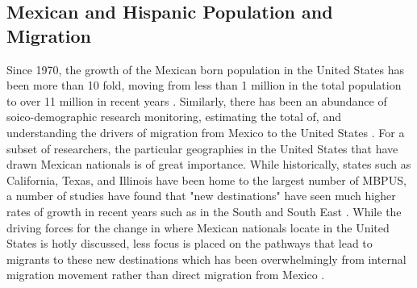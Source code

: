 \documentclass[fleqn,12pt]{olplainarticle}
\begin{document}
\subsection*{Mexican and Hispanic Population and Migration}

Since 1970, the growth of the Mexican born population in the United States has been more than 10 fold, moving from less than 1 million in the total population to over 11 million in recent years \citep{ Gonzalez-Barrera2013, Noe-Bustamante2019a}.
Similarly, there has been an abundance of soico-demographic research monitoring, estimating the total of, and understanding the drivers of migration from Mexico to the United States \citep{Massey1986}.
For a subset of researchers, the particular geographies in the United States that have drawn Mexican nationals is of great importance.
While historically, states such as California, Texas, and Illinois have been home to the largest number of MBPUS, a number of studies have found that "new destinations" have seen much higher rates of growth in recent years such as in the South and South East \citep{Singer2004, Ellis2016,  Hernandez-Leon2000,  Massey2008,  Garip2016,  Crowley2006, Massey2002}.
While the driving forces for the change in where Mexican nationals locate in the United States is hotly discussed, less focus is placed on the pathways that lead to migrants to these new destinations which has been overwhelmingly from internal migration movement rather than direct migration from Mexico \citep{Lichter2009}. 
\end{document}
